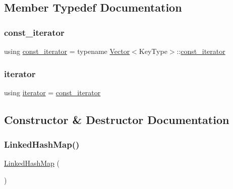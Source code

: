 \subsection{Member Typedef Documentation}
\mbox{\label{classLinkedHashMap_a40260d13231ddfc81d864ded4ad05c45}} 
\subsubsection{\texorpdfstring{const\+\_\+iterator}{const\_iterator}}
{\footnotesize\ttfamily using \mbox{\hyperlink{classLinkedHashMap_a40260d13231ddfc81d864ded4ad05c45}{const\+\_\+iterator}} =  typename \mbox{\hyperlink{classVector}{Vector}}$<$Key\+Type$>$\+::\mbox{\hyperlink{classLinkedHashMap_a40260d13231ddfc81d864ded4ad05c45}{const\+\_\+iterator}}}

\mbox{\label{classLinkedHashMap_ab3d10e70baaeac78e76b7abae7e2cf76}} 
\subsubsection{\texorpdfstring{iterator}{iterator}}
{\footnotesize\ttfamily using \mbox{\hyperlink{classLinkedHashMap_ab3d10e70baaeac78e76b7abae7e2cf76}{iterator}} =  \mbox{\hyperlink{classLinkedHashMap_a40260d13231ddfc81d864ded4ad05c45}{const\+\_\+iterator}}}



\subsection{Constructor \& Destructor Documentation}
\mbox{\label{classLinkedHashMap_a9b6d44aae08255348425c16378961467}} 
\subsubsection{\texorpdfstring{Linked\+Hash\+Map()}{LinkedHashMap()}\hspace{0.1cm}{\footnotesize\ttfamily [1/2]}}
{\footnotesize\ttfamily \mbox{\hyperlink{classLinkedHashMap}{Linked\+Hash\+Map}} (\begin{DoxyParamCaption}{ }\end{DoxyParamCaption})\hspace{0.3cm}{\ttfamily [default]}}

